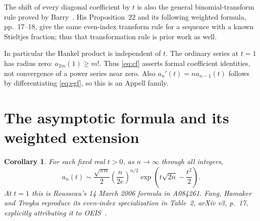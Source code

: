 \documentclass[11pt]{article}
\newtheorem{corollary}[theorem]{Corollary}
\begin{document}
The shift of every diagonal coefficient by $t$ is also the general
binomial-transform rule proved by Barry~\cite[Proposition 4]{barry-cf}.
His Proposition~22 and its following weighted formula, pp.~17--18,
give the same even-index transform rule for a sequence with a known
Stieltjes fraction; thus that transformation rule is prior work as well.

In particular the Hankel product is independent of $t$. The ordinary
series at $t=1$ has radius zero: $a_{2m}(1)\geq m!$.
Thus \eqref{eq:cf} asserts formal coefficient identities, not convergence
of a power series near zero. Also $a_n'(t)=na_{n-1}(t)$ follows by
differentiating \eqref{eq:egf}, so this is an Appell family.

\section{The asymptotic formula and its weighted extension}
\begin{corollary}\label{cor:asymptotic}
For each fixed real $t>0$, as $n\to\infty$ through all integers,
\begin{equation}\label{eq:asymptotic}
 a_n(t)\sim\frac{\sqrt{\pi n}}2
       \left(\frac n{2e}\right)^{n/2}
       \exp\left(t\sqrt{2n}-\frac{t^2}{2}\right).
\end{equation}
At $t=1$ this is Rousseau's 14 March 2006 formula in A084261.
Fang, Hamaker and Troyka reproduce its even-index specialization in
Table~2, arXiv v3, p.~17, explicitly attributing it to OEIS~\cite{fang}.
\end{corollary}
\end{document}
